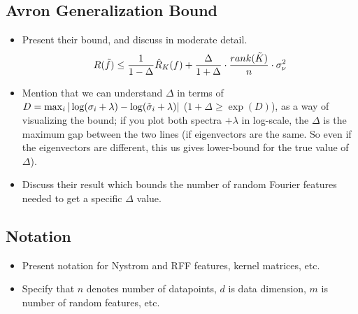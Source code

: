 \subsection{Avron Generalization Bound}
\begin{itemize}
	\item Present their bound, and discuss in moderate detail. 
	$$R(\tilde{f}) \leq \frac{1}{1-\Delta}\hat{R}_K(f) + \frac{\Delta}{1+\Delta} \cdot \frac{rank(\tilde{K})}{n}\cdot \sigma_{\nu}^2$$ 
	\item Mention that we can understand $\Delta$ in terms of $D =\max_i |\log(\sigma_i + \lambda) - \log(\tilde{\sigma}_i + \lambda)|$ ($1+\Delta \geq \exp(D)$), as a way of visualizing the bound; if you plot both spectra $+\lambda$ in log-scale, the $\Delta$ is the maximum gap between the two lines (if eigenvectors are the same.  So even if the eigenvectors are different, this us gives lower-bound for the true value of $\Delta$).
	\item Discuss their result which bounds the number of random Fourier features needed to get a specific $\Delta$ value.
\end{itemize}

\subsection{Notation}
\begin{itemize}
	\item Present notation for Nystrom and RFF features, kernel matrices, etc.  
	\item Specify that $n$ denotes number of datapoints, $d$ is data dimension, $m$ is number of random features, etc.
\end{itemize}